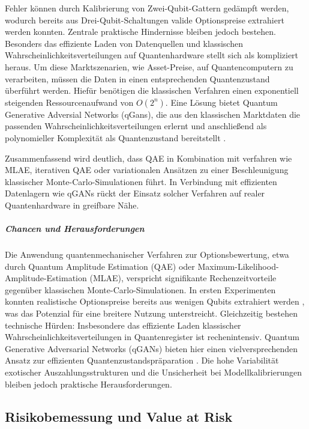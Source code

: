 Fehler können durch Kalibrierung von Zwei-Qubit-Gattern gedämpft werden, wodurch bereits aus Drei-Qubit-Schaltungen valide Optionspreise extrahiert werden konnten. Zentrale praktische Hindernisse bleiben jedoch bestehen. Besonders das effiziente Laden von Datenquellen und klassischen Wahrscheinlichkeitsverteilungen auf Quantenhardware stellt sich als kompliziert heraus. Um diese Marktszenarien, wie Asset-Preise, auf Quantencomputern zu verarbeiten, müssen die Daten in einen entsprechenden Quantenzustand überführt werden. Hiefür benötigen die klassischen Verfahren einen exponentiell steigenden Ressourcenaufwand von $O(2^n)$. Eine Lösung bietet Quantum Generative Adversial Networks (qGans), die aus den klassischen Marktdaten die passenden Wahrscheinlichkeitsverteilungen erlernt und anschließend als polynomieller Komplexität als Quantenzustand bereitstellt \cite{zoufal_quantum_2019}.

Zusammenfassend wird deutlich, dass QAE in Kombination mit verfahren wie MLAE, iterativen QAE oder variationalen Ansätzen zu einer Beschleunigung klassischer Monte-Carlo-Simulationen führt. In Verbindung mit effizienten Datenlagern wie qGANs rückt der Einsatz solcher Verfahren auf realer Quantenhardware in greifbare Nähe.

\subparagraph{Chancen und Herausforderungen}

Die Anwendung quantenmechanischer Verfahren zur Optionsbewertung, etwa durch Quantum Amplitude Estimation (QAE) oder Maximum-Likelihood-Amplitude-Estimation (MLAE), verspricht signifikante Rechenzeitvorteile gegenüber klassischen Monte-Carlo-Simulationen. In ersten Experimenten konnten realistische Optionspreise bereits aus wenigen Qubits extrahiert werden \cite[S. 4–6]{stamatopoulos_option_2020}, was das Potenzial für eine breitere Nutzung unterstreicht. Gleichzeitig bestehen technische Hürden: Insbesondere das effiziente Laden klassischer Wahrscheinlichkeitsverteilungen in Quantenregister ist rechenintensiv. Quantum Generative Adversarial Networks (qGANs) bieten hier einen vielversprechenden Ansatz zur effizienten Quantenzustandspräparation \cite[S. 1–3]{zoufal_quantum_2019}. Die hohe Variabilität exotischer Auszahlungsstrukturen und die Unsicherheit bei Modellkalibrierungen bleiben jedoch praktische Herausforderungen.

\subsection{Risikobemessung und Value at Risk}

